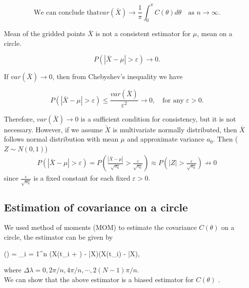  
\[
	\mbox{We can conclude that}	var(\bar{X}) \to \frac{1}{\pi} \int_0^\pi C(\theta)d\theta \quad \mbox{as $n \to \infty$}.  
\]


\begin{prop}
	
	Mean of the gridded points $\bar{X}$ is not a consistent estimator for $\mu$, mean on a circle. 
	
	\[
		P(|\bar{X} - \mu| > \varepsilon) \to 0.
	\]  
	
	If $var(\bar{X}) \to 0$, then from Chebyshev's inequality we have 
	
	\[
		P(|\bar{X} - \mu| > \varepsilon) \le \frac{var(\bar{X})}{\varepsilon^2} \to 0, \quad \mbox{for any $\varepsilon > 0$}.
	\]
	
	Therefore, $var(\bar{X}) \to 0$ is a sufficient condition for consistency, but it is not necessary. However, if we assume $\utilde{X}$ is multivariate normally distributed, then $\bar{X}$ follows normal distribution with mean $\mu$ and approximate variance $a_0$. Then ($Z \sim N(0, 1)$)
	\begin{eqnarray*}
		P(|\bar{X} - \mu| > \varepsilon) = P\left(\frac{|\bar{X} - \mu|}{\sqrt{a_0}} > \frac{\varepsilon}{\sqrt{a_0}}\right) \approx P\left(|Z| > \frac{\varepsilon}{\sqrt{a_0}}\right) \not\to 0  
	\end{eqnarray*}
	since $\frac{\varepsilon}{\sqrt{a_0}}$ is a fixed constant for each fixed $\varepsilon > 0$.\\
	
\end{prop}

\subsection{Estimation of covariance on a circle} \label{est_covariance}

We used method of moments (MOM) to estimate the covariance $C(\theta)$ on a circle, the estimator can be given by

\beq \label{covarince_estimator}
(\Delta \lambda) = \sum_{i = 1}^n (X(t_i + \Delta \lambda) - \bar{X})(X(t_i) - \bar{X}), 
\eeq

where $\Delta \lambda = 0, 2\pi/n, 4\pi/n, \cdots, 2(N-1)\pi/n$.\\

We can show that the above estimator is a biased estimator for $C(\theta)$ .

